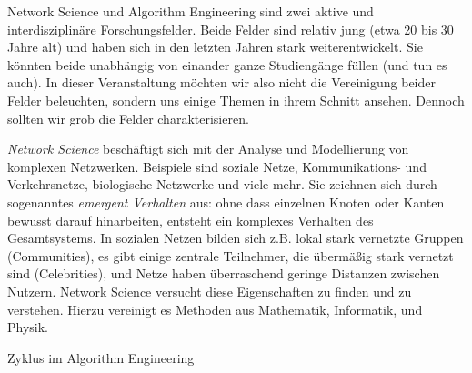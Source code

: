 \glqq Network Science\grqq{} und \glqq Algorithm Engineering\grqq{} sind zwei aktive und interdisziplinäre Forschungsfelder.
Beide Felder sind relativ jung (etwa 20 bis 30 Jahre alt) und haben sich in den letzten Jahren stark weiterentwickelt.
Sie könnten beide unabhängig von einander ganze Studiengänge füllen (und tun es auch).
In dieser Veranstaltung möchten wir also nicht die Vereinigung beider Felder beleuchten, sondern uns einige Themen in ihrem Schnitt ansehen.
Dennoch sollten wir grob die Felder charakterisieren.

\emph{Network Science} beschäftigt sich mit der Analyse und Modellierung von komplexen Netzwerken.
Beispiele sind soziale Netze, Kommunikations- und Verkehrsnetze, biologische Netzwerke und viele mehr.
Sie zeichnen sich durch sogenanntes \emph{emergent Verhalten} aus: ohne dass einzelnen Knoten oder Kanten bewusst darauf hinarbeiten, entsteht ein komplexes Verhalten des Gesamtsystems.
In sozialen Netzen bilden sich z.B. lokal stark vernetzte Gruppen (Communities), es gibt einige zentrale Teilnehmer, die übermäßig stark vernetzt sind (Celebrities), und Netze haben überraschend geringe Distanzen zwischen Nutzern.
Network Science versucht diese Eigenschaften zu finden und zu verstehen.
Hierzu vereinigt es Methoden aus Mathematik, Informatik, und Physik.

\begin{marginfigure}
    \caption{Zyklus im Algorithm Engineering}
    \label{fig:intro/algorithm-engineering}
\end{marginfigure}

